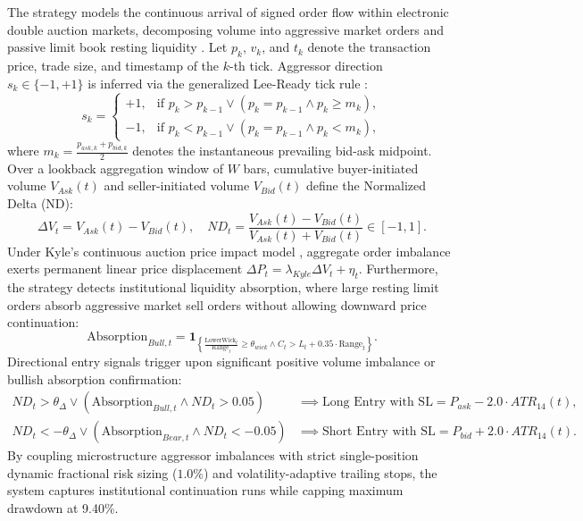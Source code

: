 \documentclass[11pt,a4paper]{article}
\begin{document}
The strategy models the continuous arrival of signed order flow within electronic double auction markets, decomposing volume into aggressive market orders and passive limit book resting liquidity \cite{biais1995an, hasbrouck1991measuring}.
Let $p_k$, $v_k$, and $t_k$ denote the transaction price, trade size, and timestamp of the $k$-th tick. Aggressor direction $s_k \in \{-1, +1\}$ is inferred via the generalized Lee-Ready tick rule \cite{lee1991inferring}:
\begin{equation}
s_k = \begin{cases}
+1, & \text{if } p_k > p_{k-1} \lor (p_k = p_{k-1} \land p_k \ge m_k), \\
-1, & \text{if } p_k < p_{k-1} \lor (p_k = p_{k-1} \land p_k < m_k),
\end{cases}
\end{equation}
where $m_k = \frac{p_{ask, k} + p_{bid, k}}{2}$ denotes the instantaneous prevailing bid-ask midpoint.
Over a lookback aggregation window of $W$ bars, cumulative buyer-initiated volume $V_{Ask}(t)$ and seller-initiated volume $V_{Bid}(t)$ define the Normalized Delta (ND):
\begin{equation}
\Delta V_t = V_{Ask}(t) - V_{Bid}(t), \quad ND_t = \frac{V_{Ask}(t) - V_{Bid}(t)}{V_{Ask}(t) + V_{Bid}(t)} \in [-1, 1].
\end{equation}
Under Kyle's continuous auction price impact model \cite{kyle1985continuous, evans2002order}, aggregate order imbalance exerts permanent linear price displacement $\Delta P_t = \lambda_{Kyle} \Delta V_t + \eta_t$.
Furthermore, the strategy detects institutional liquidity absorption, where large resting limit orders absorb aggressive market sell orders without allowing downward price continuation:
\begin{equation}
\text{Absorption}_{Bull, t} = \mathbf{1}_{\left\{ \frac{\text{LowerWick}_t}{\text{Range}_t} \ge \theta_{wick} \land C_t > L_t + 0.35 \cdot \text{Range}_t \right\}}.
\end{equation}
Directional entry signals trigger upon significant positive volume imbalance or bullish absorption confirmation:
\begin{align}
ND_t > \theta_{\Delta} \lor (\text{Absorption}_{Bull, t} \land ND_t > 0.05) & \implies \text{Long Entry with } \text{SL} = P_{ask} - 2.0 \cdot ATR_{14}(t), \\
ND_t < -\theta_{\Delta} \lor (\text{Absorption}_{Bear, t} \land ND_t < -0.05) & \implies \text{Short Entry with } \text{SL} = P_{bid} + 2.0 \cdot ATR_{14}(t).
\end{align}
By coupling microstructure aggressor imbalances with strict single-position dynamic fractional risk sizing ($1.0\%$) and volatility-adaptive trailing stops, the system captures institutional continuation runs while capping maximum drawdown at 9.40\%.
\end{document}
